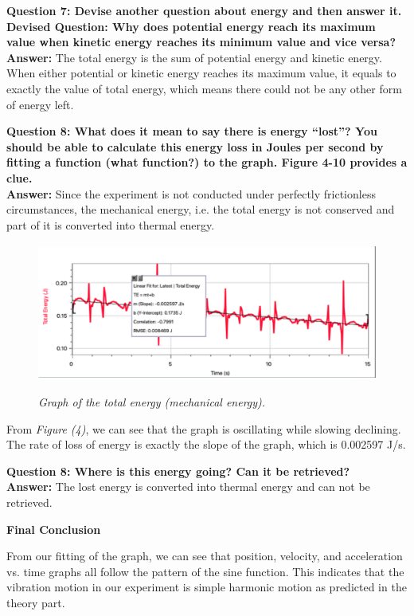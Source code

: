\documentclass{article}
\begin{document}
\textbf{Question 7: Devise another question about energy and then answer it.}\\
\textbf{Devised Question: Why does potential energy reach its maximum value when kinetic energy reaches its minimum value and vice versa?} \\
\textbf{Answer:} The total energy is the sum of potential energy and kinetic energy. When either potential or kinetic energy reaches its maximum value, it equals to exactly the value of total energy, which means there could not be any other form of energy left.

\textbf{Question 8: What does it mean to say there is energy “lost”? You should be able to calculate this energy loss in Joules per second by fitting a function (what function?) to the graph. Figure 4-10 provides a clue.}\\
\textbf{Answer:} Since the experiment is not conducted under perfectly frictionless circumstances, the mechanical energy, i.e. the total energy is not conserved and part of it is converted into thermal energy. 

\begin{figure}[h!]
\centering
\includegraphics[height=4.5cm]{Figures/figure4.png} \\
\caption{\textit{Graph of the total energy (mechanical energy).}}
\label{fig:Logger Pro graph}
\end{figure}

From \textit{Figure (4)}, we can see that the graph is oscillating while slowing declining. The rate of loss of energy is exactly the slope of the graph, which is 0.002597 J/s.

\textbf{Question 8: Where is this energy going? Can it be retrieved?}\\
\textbf{Answer:} The lost energy is converted into thermal energy and can not be retrieved. 

\begin{center}
\large\textbf{Final Conclusion}
\end{center}

From our fitting of the graph, we can see that position, velocity, and acceleration vs. time graphs all follow the pattern of the sine function. This indicates that the vibration motion in our experiment is simple harmonic motion as predicted in the theory part. 
\end{document}
